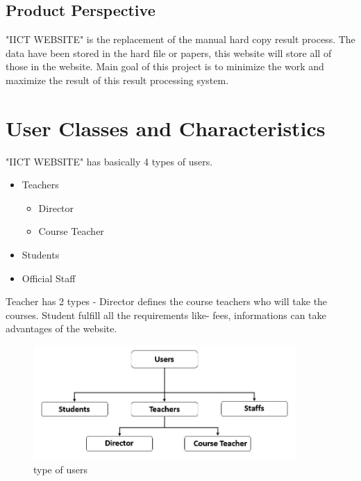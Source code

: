 \documentclass{scrreprt}
\begin{document}
\subsection{Product Perspective}
"IICT WEBSITE" is the replacement of the manual hard copy result process. The data have been stored in the hard file or papers, this website will store all of those in the website. Main goal of this project is to minimize the work and maximize the result of this result processing system.

\section{User Classes and Characteristics}
"IICT WEBSITE" has basically 4 types of users. 
\begin{itemize}
  \item Teachers
    \begin{itemize}
        \item Director
        \item Course Teacher
    \end{itemize}
  \item Students
  \item Official Staff
\end{itemize}
Teacher has 2 types - Director defines the course teachers who will take the courses. Student fulfill all the requirements like- fees, informations can take advantages of the website. 
\begin{figure}
    \centering
    \includegraphics[width=10cm]{2.JPG}
    \caption{type of users}
    \label{fig:type of users}
\end{figure}
\end{document}

